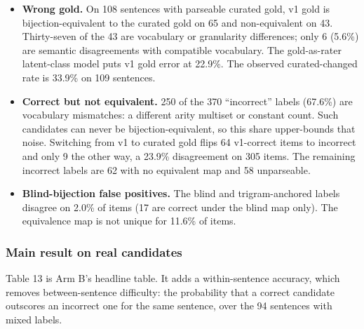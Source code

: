 \documentclass[11pt,letterpaper]{article}
\begin{document}
\begin{itemize}
\item {}\textbf{Wrong gold.} On 108 sentences with parseable curated gold, v1 gold is bijection-equivalent to the curated gold on 65 and non-equivalent on 43. Thirty-seven of the 43 are vocabulary or granularity differences; only 6 (5.6\%) are semantic disagreements with compatible vocabulary. The gold-as-rater latent-class model puts v1 gold error at 22.9\%. The observed curated-changed rate is 33.9\% on 109 sentences.
\item {}\textbf{Correct but not equivalent.} 250 of the 370 ``incorrect'' labels (67.6\%) are vocabulary mismatches: a different arity multiset or constant count. Such candidates can never be bijection-equivalent, so this share upper-bounds that noise. Switching from v1 to curated gold flips 64 v1-correct items to incorrect and only 9 the other way, a 23.9\% disagreement on 305 items. The remaining incorrect labels are 62 with no equivalent map and 58 unparseable.
\item {}\textbf{Blind-bijection false positives.} The blind and trigram-anchored labels disagree on 2.0\% of items (17 are correct under the blind map only). The equivalence map is not unique for 11.6\% of items.
\end{itemize}
\subsubsection{Main result on real candidates}

Table 13 is Arm B's headline table. It adds a within-sentence accuracy, which removes between-sentence difficulty: the probability that a correct candidate outscores an incorrect one for the same sentence, over the 94 sentences with mixed labels.
\end{document}
